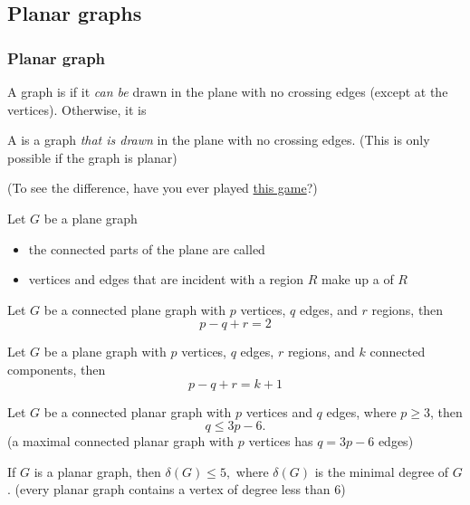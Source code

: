 \documentclass[aspectratio=169]{beamer}\usepackage[]{graphicx}\usepackage[]{xcolor}
\begin{document}
\subsection{Planar graphs}



\begin{frame}\frametitle{Planar graph}
\begin{definition}
A graph is  if it \emph{can be} drawn in the plane with no crossing edges (except at the vertices). Otherwise, it is 
\end{definition}
\vfill
\begin{definition}
A  is a graph \emph{that is drawn} in the plane with no crossing edges. (This is only possible if the graph is planar)
\end{definition}
\vfill
(To see the difference, have you ever played \href{https://www.chiark.greenend.org.uk/~sgtatham/puzzles/js/untangle.html}{this game}?)
\end{frame}



\begin{frame}
Let $G$ be a plane graph
\begin{itemize}
\item the connected parts of the plane are called 
\item vertices and edges that are incident with a region $R$ make up a  of $R$
\end{itemize}
\vfill
\begin{theorem}
Let $G$ be a connected plane graph with $p$ vertices, $q$ edges, and $r$ regions, then $$p-q+r=2$$
\end{theorem}
\vfill
\begin{corollary}
Let $G$ be a plane graph with $p$ vertices, $q$ edges, $r$ regions, and $k$ connected components, then $$p-q+r=k+1$$
\end{corollary}
\end{frame}


\begin{frame}
\begin{theorem}
Let $G$ be a connected planar graph with $p$ vertices and $q$ edges, where $p\geq 3$, then $$q\leq 3p-6.$$
(a maximal connected planar graph with $p$ vertices has $q=3p-6$ edges)
\end{theorem}
\vfill
\begin{corollary}
If $G$ is a planar graph, then $\delta(G)\leq 5,$
where $\delta(G)$ is the minimal degree of $G$.
(every planar graph contains a vertex of degree less than 6)
\end{corollary}
\end{frame}
\end{document}
